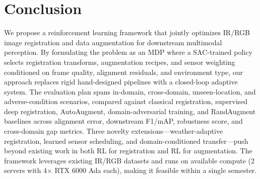 \documentclass[12pt]{article}
\begin{document}
\section{Conclusion}

We propose a reinforcement learning framework that jointly optimizes IR/RGB image registration and data augmentation for downstream multimodal perception. By formulating the problem as an MDP where a SAC-trained policy selects registration transforms, augmentation recipes, and sensor weighting conditioned on frame quality, alignment residuals, and environment type, our approach replaces rigid hand-designed pipelines with a closed-loop adaptive system. The evaluation plan spans in-domain, cross-domain, unseen-location, and adverse-condition scenarios, compared against classical registration, supervised deep registration, AutoAugment, domain-adversarial training, and RandAugment baselines across alignment error, downstream F1/mAP, robustness score, and cross-domain gap metrics. Three novelty extensions---weather-adaptive registration, learned sensor scheduling, and domain-conditioned transfer---push beyond existing work in both RL for registration and RL for augmentation. The framework leverages existing IR/RGB datasets and runs on available compute (2 servers with 4$\times$ RTX 6000 Ada each), making it feasible within a single semester.


\nocite{*}
\end{document}
